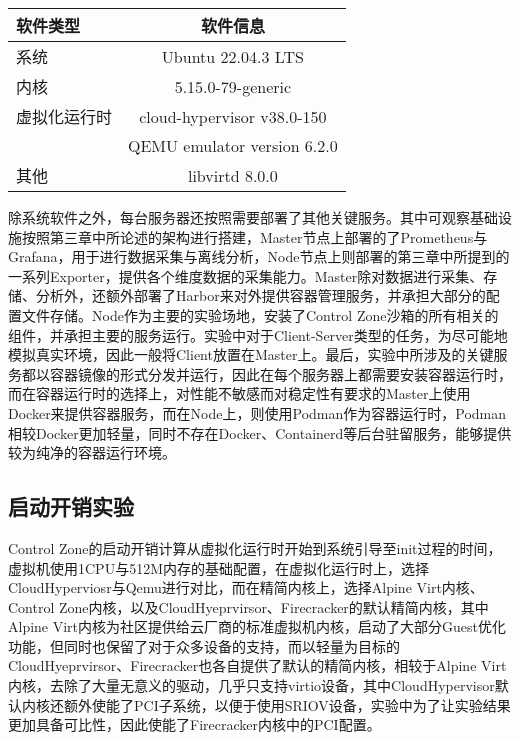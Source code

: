 \begin{table}
    \label{tab:system_env}
    \footnotesize%
    \setlength{\tabcolsep}{4pt}%
    \renewcommand{\arraystretch}{1.5}%
    \centering
    \begin{tabular}{lc}
        \hline
        软件类型 & 软件信息 \\
        \hline
        系统 & Ubuntu 22.04.3 LTS  \\
        内核 & 5.15.0-79-generic \\
        虚拟化运行时 & cloud-hypervisor v38.0-150 \\
                   & QEMU emulator version 6.2.0 \\
        其他        & libvirtd 8.0.0 \\
        \hline
    \end{tabular}
\end{table}

除系统软件之外，每台服务器还按照需要部署了其他关键服务。其中可观察基础设施按照第三章中所论述的架构进行搭建，Master节点上部署的了Prometheus与Grafana，用于进行数据采集与离线分析，Node节点上则部署的第三章中所提到的一系列Exporter，提供各个维度数据的采集能力。Master除对数据进行采集、存储、分析外，还额外部署了Harbor来对外提供容器管理服务，并承担大部分的配置文件存储。Node作为主要的实验场地，安装了Control Zone沙箱的所有相关的组件，并承担主要的服务运行。实验中对于Client-Server类型的任务，为尽可能地模拟真实环境，因此一般将Client放置在Master上。最后，实验中所涉及的关键服务都以容器镜像的形式分发并运行，因此在每个服务器上都需要安装容器运行时，而在容器运行时的选择上，对性能不敏感而对稳定性有要求的Master上使用Docker来提供容器服务，而在Node上，则使用Podman作为容器运行时，Podman相较Docker更加轻量，同时不存在Docker、Containerd等后台驻留服务，能够提供较为纯净的容器运行环境。

\subsection{启动开销实验}

Control Zone的启动开销计算从虚拟化运行时开始到系统引导至init过程的时间，虚拟机使用1CPU与512M内存的基础配置，在虚拟化运行时上，选择CloudHyperviosr与Qemu进行对比，而在精简内核上，选择Alpine Virt内核、Control Zone内核，以及CloudHyeprvirsor、Firecracker的默认精简内核，其中Alpine Virt内核为社区提供给云厂商的标准虚拟机内核，启动了大部分Guest优化功能，但同时也保留了对于众多设备的支持，而以轻量为目标的CloudHyeprvirsor、Firecracker也各自提供了默认的精简内核，相较于Alpine Virt内核，去除了大量无意义的驱动，几乎只支持virtio设备，其中CloudHypervisor默认内核还额外使能了PCI子系统，以便于使用SRIOV设备，实验中为了让实验结果更加具备可比性，因此使能了Firecracker内核中的PCI配置。

